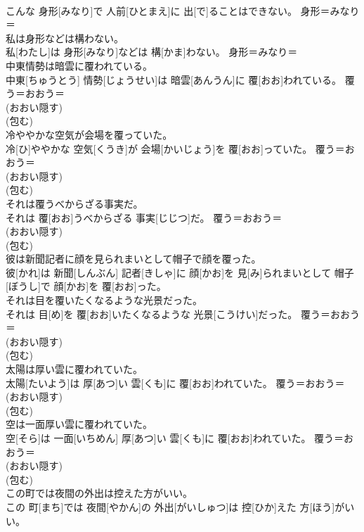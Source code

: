 \documentclass[8pt]{extreport}
\begin{document}
\begin{CJK}{UTF8}{min}
{\\	こんな 身形[みなり]で 人前[ひとまえ]に 出[で]ることはできない。	身形＝みなり＝ 
\\	私は身形などは構わない。	
\\	私[わたし]は 身形[みなり]などは 構[かま]わない。	身形＝みなり＝ 
\\	中東情勢は暗雲に覆われている。	
\\	中東[ちゅうとう] 情勢[じょうせい]は 暗雲[あんうん]に 覆[おお]われている。	覆う＝おおう＝ 
\\	(おおい隠す) 
\\	(包む) 
\\	冷ややかな空気が会場を覆っていた。	
\\	冷[ひ]ややかな 空気[くうき]が 会場[かいじょう]を 覆[おお]っていた。	覆う＝おおう＝ 
\\	(おおい隠す) 
\\	(包む) 
\\	それは覆うべからざる事実だ。	
\\	それは 覆[おお]うべからざる 事実[じじつ]だ。	覆う＝おおう＝ 
\\	(おおい隠す) 
\\	(包む) 
\\	彼は新聞記者に顔を見られまいとして帽子で顔を覆った。	
\\	彼[かれ]は 新聞[しんぶん] 記者[きしゃ]に 顔[かお]を 見[み]られまいとして 帽子[ぼうし]で 顔[かお]を 覆[おお]った。	
\\	それは目を覆いたくなるような光景だった。	
\\	それは 目[め]を 覆[おお]いたくなるような 光景[こうけい]だった。	覆う＝おおう＝ 
\\	(おおい隠す) 
\\	(包む) 
\\	太陽は厚い雲に覆われていた。	
\\	太陽[たいよう]は 厚[あつ]い 雲[くも]に 覆[おお]われていた。	覆う＝おおう＝ 
\\	(おおい隠す) 
\\	(包む) 
\\	空は一面厚い雲に覆われていた。	
\\	空[そら]は 一面[いちめん] 厚[あつ]い 雲[くも]に 覆[おお]われていた。	覆う＝おおう＝ 
\\	(おおい隠す) 
\\	(包む) 
\\	この町では夜間の外出は控えた方がいい。	
\\	この 町[まち]では 夜間[やかん]の 外出[がいしゅつ]は 控[ひか]えた 方[ほう]がいい。	
}
\end{CJK}
\end{document}
